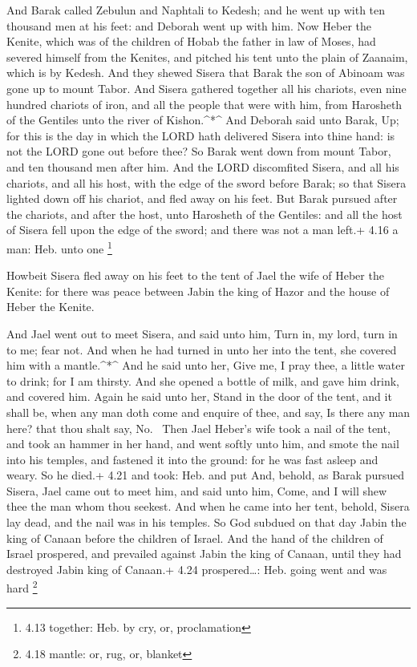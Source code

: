  And Barak called Zebulun and Naphtali to Kedesh; and he
went up with ten thousand men at his feet: and Deborah went up with him.
 Now Heber the Kenite, which was of the children of Hobab
the father in law of Moses, had severed himself from the Kenites, and
pitched his tent unto the plain of Zaanaim, which is by Kedesh.
 And they shewed Sisera that Barak the son of Abinoam was
gone up to mount Tabor.  And Sisera gathered together all
his chariots, even nine hundred chariots of iron, and all the people
that were with him, from Harosheth of the Gentiles unto the river of
Kishon.\^{}*\^{}  And Deborah said unto Barak, Up; for this
is the day in which the LORD hath delivered Sisera into thine hand: is
not the LORD gone out before thee? So Barak went down from mount Tabor,
and ten thousand men after him.  And the LORD discomfited
Sisera, and all his chariots, and all his host, with the edge of the
sword before Barak; so that Sisera lighted down off his chariot, and
fled away on his feet.  But Barak pursued after the
chariots, and after the host, unto Harosheth of the Gentiles: and all
the host of Sisera fell upon the edge of the sword; and there was not a
man left.+ 4.16 a man: Heb. unto one \footnote{4.13 together: Heb. by
  cry, or, proclamation}

 Howbeit Sisera fled away on his feet to the tent of Jael
the wife of Heber the Kenite: for there was peace between Jabin the king
of Hazor and the house of Heber the Kenite.

 And Jael went out to meet Sisera, and said unto him, Turn
in, my lord, turn in to me; fear not. And when he had turned in unto her
into the tent, she covered him with a mantle.\^{}*\^{}  And
he said unto her, Give me, I pray thee, a little water to drink; for I
am thirsty. And she opened a bottle of milk, and gave him drink, and
covered him.  Again he said unto her, Stand in the door of
the tent, and it shall be, when any man doth come and enquire of thee,
and say, Is there any man here? that thou shalt say, No.~
Then Jael Heber's wife took a nail of the tent, and took an hammer in
her hand, and went softly unto him, and smote the nail into his temples,
and fastened it into the ground: for he was fast asleep and weary. So he
died.+ 4.21 and took: Heb. and put  And, behold, as Barak
pursued Sisera, Jael came out to meet him, and said unto him, Come, and
I will shew thee the man whom thou seekest. And when he came into her
tent, behold, Sisera lay dead, and the nail was in his temples.
 So God subdued on that day Jabin the king of Canaan before
the children of Israel.  And the hand of the children of
Israel prospered, and prevailed against Jabin the king of Canaan, until
they had destroyed Jabin king of Canaan.+ 4.24 prospered\ldots: Heb.
going went and was hard \footnote{4.18 mantle: or, rug, or, blanket}

